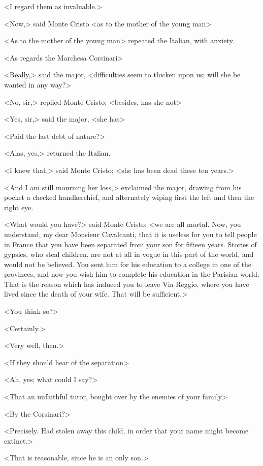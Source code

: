  <I regard them as invaluable.> 

 <Now,> said Monte Cristo <as to the mother of the young man\longdash> 

 <As to the mother of the young man\longdash> repeated the Italian, with anxiety. 

 <As regards the Marchesa Corsinari\longdash> 

 <Really,> said the major, <difficulties seem to thicken upon us; will she be wanted in any way?> 

 <No, sir,> replied Monte Cristo; <besides, has she not\longdash> 

 <Yes, sir,> said the major, <she has\longdash>

<Paid the last debt of nature?> 

 <Alas, yes,> returned the Italian. 

 <I knew that,> said Monte Cristo; <she has been dead these ten years.> 

 <And I am still mourning her loss,> exclaimed the major, drawing from his pocket a checked handkerchief, and alternately wiping first the left and then the right eye. 

 <What would you have?> said Monte Cristo; <we are all mortal. Now, you understand, my dear Monsieur Cavalcanti, that it is useless for you to tell people in France that you have been separated from your son for fifteen years. Stories of gypsies, who steal children, are not at all in vogue in this part of the world, and would not be believed. You sent him for his education to a college in one of the provinces, and now you wish him to complete his education in the Parisian world. That is the reason which has induced you to leave Via Reggio, where you have lived since the death of your wife. That will be sufficient.> 

 <You think so?> 

 <Certainly.> 

 <Very well, then.> 

 <If they should hear of the separation\longdash> 

 <Ah, yes; what could I say?> 

 <That an unfaithful tutor, bought over by the enemies of your family\longdash> 

 <By the Corsinari?> 

 <Precisely. Had stolen away this child, in order that your name might become extinct.> 

 <That is reasonable, since he is an only son.> 

